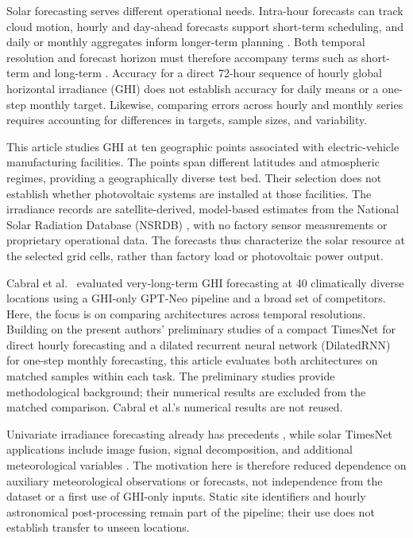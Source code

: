 Solar forecasting serves different operational needs. Intra-hour forecasts
can track cloud motion, hourly and day-ahead forecasts support short-term
scheduling, and daily or monthly aggregates inform longer-term planning
\cite{diagne2013,inman2013}. Both temporal resolution and forecast horizon
must therefore accompany terms such as short-term and long-term
\cite{antonanzas2016,yang2018}. Accuracy for a direct 72-hour sequence of
hourly global horizontal irradiance (GHI) does not establish accuracy for
daily means or a one-step monthly target. Likewise, comparing errors across
hourly and monthly series requires accounting for differences in targets,
sample sizes, and variability.

This article studies GHI at ten geographic points associated with
electric-vehicle manufacturing facilities. The points span different
latitudes and atmospheric regimes, providing a geographically diverse test
bed. Their selection does not establish whether photovoltaic systems are
installed at those facilities. The irradiance records are satellite-derived,
model-based estimates from the National Solar Radiation Database (NSRDB)
\cite{sengupta2018}, with no factory sensor measurements or proprietary
operational data. The forecasts thus characterize the solar resource at the
selected grid cells, rather than factory load or photovoltaic power output.

Cabral et al.\ \cite{cabral2026} evaluated very-long-term GHI forecasting at
40 climatically diverse locations using a GHI-only GPT-Neo pipeline and a
broad set of competitors. Here, the focus is on comparing architectures
across temporal resolutions. Building on the present authors' preliminary studies of
a compact TimesNet for direct hourly forecasting and a dilated recurrent
neural network (DilatedRNN) for one-step monthly forecasting, this article
evaluates both architectures on matched samples within each task.
The preliminary studies provide methodological background; their numerical
results are excluded from the matched comparison. Cabral et al.'s numerical
results are not reused.

Univariate irradiance forecasting already has precedents
\cite{guariso2020,cabral2026}, while solar TimesNet applications include
image fusion, signal decomposition, and additional meteorological variables
\cite{li2025timesnet,zhao2024timesnet,gong2024timesnet}. The motivation here
is therefore reduced dependence on auxiliary meteorological observations
or forecasts, not independence from the dataset or a first use of GHI-only
inputs. Static site identifiers and hourly astronomical post-processing
remain part of the pipeline; their use does not establish transfer to
unseen locations.

